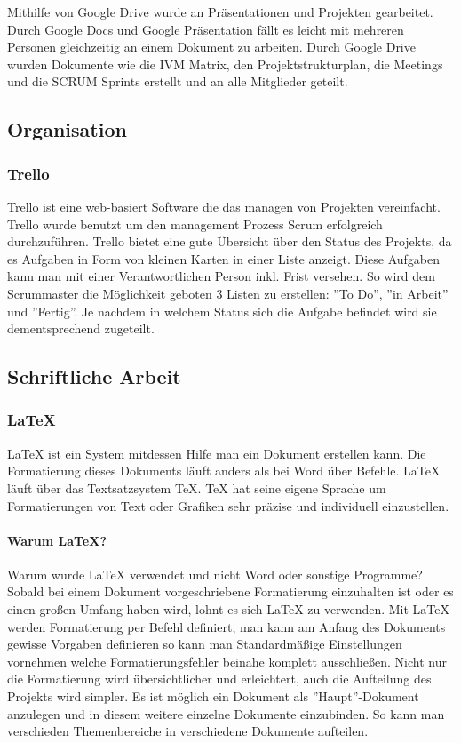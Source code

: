 Mithilfe von Google Drive wurde an Präsentationen und Projekten gearbeitet. Durch Google Docs und Google Präsentation fällt es leicht mit mehreren Personen gleichzeitig an einem Dokument zu arbeiten. Durch Google Drive wurden Dokumente wie die IVM Matrix, den Projektstrukturplan, die Meetings und die SCRUM Sprints erstellt und an alle Mitglieder geteilt. 
\subsection{Organisation}
\label{sec:Organisation}
\subsubsection {Trello}
\label{sec:Trello}
Trello ist eine web-basiert Software die das managen von Projekten vereinfacht. Trello wurde benutzt um den management Prozess Scrum erfolgreich durchzuführen. Trello bietet eine gute Übersicht über den Status des Projekts, da es Aufgaben in Form von kleinen Karten in einer Liste anzeigt. Diese Aufgaben kann man mit einer Verantwortlichen Person inkl. Frist versehen. So wird dem Scrummaster die Möglichkeit geboten 3 Listen zu erstellen: ''To Do'', ''in Arbeit'' und ''Fertig''. Je nachdem in welchem Status sich die Aufgabe befindet wird sie dementsprechend zugeteilt.

\subsection{Schriftliche Arbeit}
\label{sec:TechSchriftlicheArbeit}
\subsubsection {LaTeX}
\label{sec:LaTeX}
LaTeX ist ein System mitdessen Hilfe man ein Dokument erstellen kann. Die Formatierung dieses Dokuments läuft anders als bei Word über Befehle. LaTeX läuft über das Textsatzsystem TeX. TeX hat seine eigene Sprache um Formatierungen von Text oder Grafiken sehr präzise und individuell einzustellen. 
\paragraph{Warum LaTeX?}
\label{sec:WarumLaTeX}
Warum wurde LaTeX verwendet und nicht Word oder sonstige Programme? Sobald bei einem Dokument vorgeschriebene Formatierung einzuhalten ist oder es einen großen Umfang haben wird, lohnt es sich LaTeX zu verwenden. Mit LaTeX werden Formatierung per Befehl definiert, man kann am Anfang des Dokuments gewisse Vorgaben definieren so kann man Standardmäßige Einstellungen vornehmen welche Formatierungsfehler beinahe komplett ausschließen. Nicht nur die Formatierung wird übersichtlicher und erleichtert, auch die Aufteilung des Projekts wird simpler. Es ist möglich ein Dokument als ''Haupt''-Dokument anzulegen und in diesem weitere einzelne Dokumente einzubinden. So kann man verschieden Themenbereiche in verschiedene Dokumente aufteilen. \cite{TechnologieLaTeX} 
\pagebreak